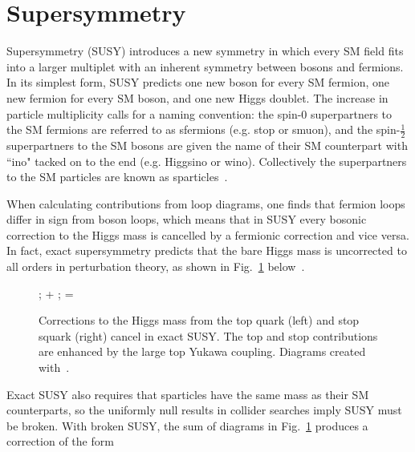\documentclass[12pt]{article}
\begin{document}
\section{Supersymmetry}
    Supersymmetry (SUSY) introduces a new symmetry in which every SM field fits into a larger multiplet with an inherent symmetry between bosons and fermions. In its simplest form, SUSY predicts one new boson for every SM fermion, one new fermion for every SM boson, and one new Higgs doublet. The increase in particle multiplicity calls for a naming convention: the spin-0 superpartners to the SM fermions are referred to as sfermions (e.g. stop or smuon), and the spin-$\frac{1}{2}$ superpartners to the SM bosons are given the name of their SM counterpart with ``ino" tacked on to the end (e.g. Higgsino or wino). Collectively the superpartners to the SM particles are known as sparticles~\cite{primer}.

    When calculating contributions from loop diagrams, one finds that fermion loops differ in sign from boson loops, which means that in SUSY every bosonic correction to the Higgs mass is cancelled by a fermionic correction and vice versa. In fact, exact supersymmetry predicts that the bare Higgs mass is uncorrected to all orders in perturbation theory, as shown in Fig.~\ref{exact_susy_correction} below~\cite{primer}.
    
    \noindent \begin{figure}[htbp] \begin{center}
        ;
    \quad + \quad
        ;
        \quad =  \quad
        \caption{Corrections to the Higgs mass from the top quark (left) and stop squark (right) cancel in exact SUSY. The top and stop contributions are enhanced by the large top Yukawa coupling. Diagrams created with~\cite{tikz}.}
        \label{exact_susy_correction}
    \end{center} \end{figure}

    Exact SUSY also requires that sparticles have the same mass as their SM counterparts, so the uniformly null results in collider searches imply SUSY must be broken. With broken SUSY, the sum of diagrams in Fig.~\ref{exact_susy_correction} produces a correction of the form~\cite{feng}
\end{document}

